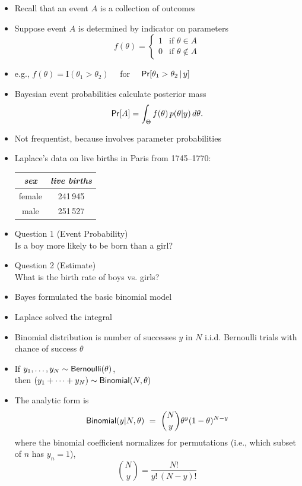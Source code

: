 \documentclass[10pt]{report}
\begin{document}
\begin{itemize}
\item Recall that an event $A$ is a collection of outcomes
\item Suppose event $A$ is determined by indicator on parameters
\[
f(\theta) 
= 
\begin{cases}
1 & \text{if } \theta \in A
\\
0 & \text{if } \theta \not\in A
\end{cases}
\]
\item e.g., $f(\theta) = \mathrm{I}(\theta_1 > \theta_2)$ 
\ \ for \ \ $\text{\sf Pr}[\theta_1 > \theta_2 \, | \, y]$
\item Bayesian event probabilities calculate posterior mass
\[
\text{\sf Pr}[A] = \int_{\Theta} f(\theta) \, p(\theta|y) \, d\theta.
\]
\item Not frequentist, because involves parameter probabilities
\end{itemize}


\begin{itemize}
\item Laplace's data on live births in Paris from 1745--1770: 
\begin{center}\small
\begin{tabular}{c|c}
{\slshape sex} & {\slshape live births}
\\ \hline
female & 241\,945 
\\
male & 251\,527
\end{tabular}
\end{center}
\item Question 1 (Event Probability) 
\\  
Is a boy more likely to be born than a girl?
\item Question 2 (Estimate) 
\\  
What is the birth rate of boys vs. girls?
\item Bayes formulated the basic binomial model
\item Laplace solved the integral
\end{itemize}

\begin{itemize}
\item Binomial distribution is number of successes $y$ in $N$ 
i.i.d. Bernoulli trials with chance of success $\theta$
\item If $y_1,\ldots,y_N\sim \text{\sf Bernoulli}(\theta)$, 
\\[4pt] then $(y_1 + \cdots + y_N) \sim \text{\sf Binomial}(N,\theta)$
\item The analytic form is
\[
\text{\sf Binomial}(y|N,\theta) 
\ = \ \binom{N}{y} \theta^{y} (1 - \theta)^{N-y}
\]
where the binomial coefficient normalizes for permutations (i.e.,
which subset of $n$ has $y_n = 1$),
\[
\binom{N}{y} = \frac{N!}{y! \, (N-y)!}
\]
\end{itemize}
\end{document}
